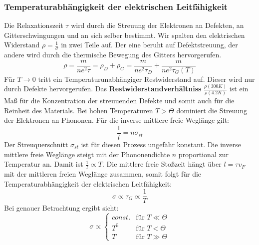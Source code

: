 \documentclass[11pt]{article}
\begin{document}
\subsubsection{Temperaturabhängigkeit der elektrischen Leitfähigkeit}
Die Relaxationszeit $\tau$ wird durch die Streuung der Elektronen an Defekten,
an Gitterschwingungen und an sich selber bestimmt. Wir spalten den elektrischen
Widerstand $\rho=\frac{1}{\sigma}$ in zwei Teile auf. Der eine beruht auf
Defektstreuung, der andere wird durch die thermische Bewegung des Gitters
hervorgerufen.
\begin{equation}
  \rho=\frac{m}{ne^2\tau}=\rho_D+\rho_G=\frac{m}{ne^2\tau_D}+
  \frac{m}{ne^2\tau_G(T)}
\end{equation}
Für $T\to 0$ tritt ein Temperaturunabhängiger Restwiderstand auf. Dieser wird
nur durch Defekte hervorgerufen. Das \textbf{Restwiderstandverhältniss}
$\frac{\rho(300K)}{\rho(4.2K)}$ ist ein Maß für die Konzentration der
streuuenden Defekte und somit auch für die Reinheit des Materials. Bei hohen
Temperaturen $T>\Theta$ dominiert die Streuung der Elektronen an Phononen. Für
die inverse mittlere freie Weglänge gilt:
\begin{equation}
  \frac{1}{l}=n\sigma_{st}
\end{equation}
Der Streuquerschnitt $\sigma_{st}$ ist für diesen Prozess ungefähr konstant. Die
inverse mittlere freie Weglänge steigt mit der Phononendichte $n$ proportional
zur Temperatur an. Damit ist $\frac{1}{l}\propto T$. Die mittlere freie Stoßzeit
hängt über $l=\tau v_F$ mit der mittleren freien Weglänge zusammen, somit folgt
für die Temperaturabhängigkeit der elektrischen Leitfähigkeit:
\begin{equation}
  \sigma\propto\tau_G\propto\frac{1}{T}
\end{equation}
Bei genauer Betrachtung ergibt sicht:
\begin{equation}
  \sigma\propto\begin{cases}
  const. & \text{für } T\ll\Theta \\
  T^5 & \text{für } T<\Theta \\
  T & \text{für } T\gg\Theta
  \end{cases}
\end{equation}
\end{document}
